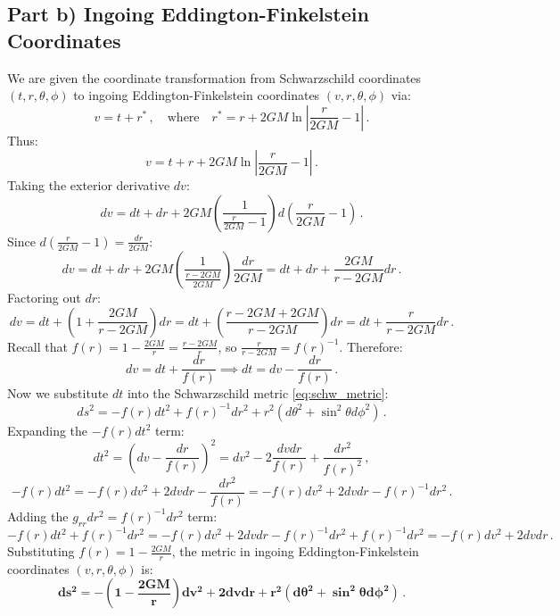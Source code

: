 \documentclass[12pt]{article}
\newcommand{\be}{\begin{equation}}
\newcommand{\ee}{\end{equation}}
\begin{document}
\subsection*{Part b) Ingoing Eddington-Finkelstein Coordinates}

We are given the coordinate transformation from Schwarzschild coordinates $(t,r,\theta,\phi)$ to ingoing Eddington-Finkelstein coordinates $(v,r,\theta,\phi)$ via:
\be
v = t + r^* \,, \quad \text{where} \quad r^* = r + 2GM \ln\left| \frac{r}{2GM} - 1 \right| \,.
\ee
Thus:
\be
v = t + r + 2GM \ln\left| \frac{r}{2GM} - 1 \right| \,.
\ee
Taking the exterior derivative $dv$:
\be
dv = dt + dr + 2GM \left( \frac{1}{\frac{r}{2GM} - 1} \right) d\left( \frac{r}{2GM} - 1 \right) \,.
\ee
Since $d\left( \frac{r}{2GM} - 1 \right) = \frac{dr}{2GM}$:
\be
dv = dt + dr + 2GM \left( \frac{1}{\frac{r - 2GM}{2GM}} \right) \frac{dr}{2GM} = dt + dr + \frac{2GM}{r - 2GM} dr \,.
\ee
Factoring out $dr$:
\be
dv = dt + \left( 1 + \frac{2GM}{r - 2GM} \right) dr = dt + \left( \frac{r - 2GM + 2GM}{r - 2GM} \right) dr = dt + \frac{r}{r - 2GM} dr \,.
\ee
Recall that $f(r) = 1 - \frac{2GM}{r} = \frac{r - 2GM}{r}$, so $\frac{r}{r - 2GM} = f(r)^{-1}$. Therefore:
\be
dv = dt + \frac{dr}{f(r)} \implies dt = dv - \frac{dr}{f(r)} \,.
\label{eq:dt_ef}
\ee
Now we substitute $dt$ into the Schwarzschild metric \eqref{eq:schw_metric}:
\be
ds^2 = - f(r) dt^2 + f(r)^{-1} dr^2 + r^2 (d\theta^2 + \sin^2\theta d\phi^2) \,.
\ee
Expanding the $-f(r) dt^2$ term:
\be
dt^2 = \left( dv - \frac{dr}{f(r)} \right)^2 = dv^2 - 2 \frac{dv dr}{f(r)} + \frac{dr^2}{f(r)^2} \,,
\ee
\be
- f(r) dt^2 = - f(r) dv^2 + 2 dv dr - \frac{dr^2}{f(r)} = - f(r) dv^2 + 2 dv dr - f(r)^{-1} dr^2 \,.
\ee
Adding the $g_{rr} dr^2 = f(r)^{-1} dr^2$ term:
\be
- f(r) dt^2 + f(r)^{-1} dr^2 = - f(r) dv^2 + 2 dv dr - f(r)^{-1} dr^2 + f(r)^{-1} dr^2 = - f(r) dv^2 + 2 dv dr \,.
\ee
Substituting $f(r) = 1 - \frac{2GM}{r}$, the metric in ingoing Eddington-Finkelstein coordinates $(v,r,\theta,\phi)$ is:
\be
\mathbf{ds^2 = - \left( 1 - \frac{2GM}{r} \right) dv^2 + 2 dv dr + r^2 \left( d\theta^2 + \sin^2\theta d\phi^2 \right)} \,.
\label{eq:ief_metric}
\ee
\end{document}
